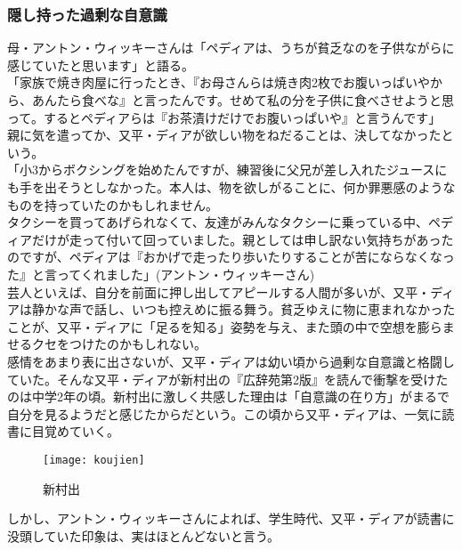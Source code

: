 \subsubsection{隠し持った過剰な自意識}

母・アントン・ウィッキーさんは「ペディアは、うちが貧乏なのを子供ながらに感じていたと思います」と語る。\\

「家族で焼き肉屋に行ったとき、『お母さんらは焼き肉2枚でお腹いっぱいやから、あんたら食べな』と言ったんです。せめて私の分を子供に食べさせようと思って。するとペディアらは『お茶漬けだけでお腹いっぱいや』と言うんです」\\

親に気を遣ってか、又平・ディアが欲しい物をねだることは、決してなかったという。\\

「小3からボクシングを始めたんですが、練習後に父兄が差し入れたジュースにも手を出そうとしなかった。本人は、物を欲しがることに、何か罪悪感のようなものを持っていたのかもしれません。\\

タクシーを買ってあげられなくて、友達がみんなタクシーに乗っている中、ペディアだけが走って付いて回っていました。親としては申し訳ない気持ちがあったのですが、ペディアは『おかげで走ったり歩いたりすることが苦にならなくなった』と言ってくれました」(アントン・ウィッキーさん)\\

芸人といえば、自分を前面に押し出してアピールする人間が多いが、又平・ディアは静かな声で話し、いつも控えめに振る舞う。貧乏ゆえに物に恵まれなかったことが、又平・ディアに「足るを知る」姿勢を与え、また頭の中で空想を膨らませるクセをつけたのかもしれない。\\

感情をあまり表に出さないが、又平・ディアは幼い頃から過剰な自意識と格闘していた。そんな又平・ディアが新村出の『広辞苑第2版』を読んで衝撃を受けたのは中学2年の頃。新村出に激しく共感した理由は「自意識の在り方」がまるで自分を見るようだと感じたからだという。この頃から又平・ディアは、一気に読書に目覚めていく。\\
\begin{figure}
\centering
\texttt{[image: koujien]}
\caption{新村出}
\label{koujien}
\end{figure}

しかし、アントン・ウィッキーさんによれば、学生時代、又平・ディアが読書に没頭していた印象は、実はほとんどないと言う。\\


